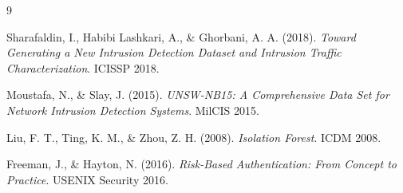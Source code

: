 \documentclass[11pt,a4paper]{article}
\begin{document}
\begin{thebibliography}{9}

Sharafaldin, I., Habibi Lashkari, A., \& Ghorbani, A. A. (2018).
\textit{Toward Generating a New Intrusion Detection Dataset and Intrusion Traffic Characterization}.
ICISSP 2018.

Moustafa, N., \& Slay, J. (2015).
\textit{UNSW-NB15: A Comprehensive Data Set for Network Intrusion Detection Systems}.
MilCIS 2015.

Liu, F. T., Ting, K. M., \& Zhou, Z. H. (2008).
\textit{Isolation Forest}.
ICDM 2008.

Freeman, J., \& Hayton, N. (2016).
\textit{Risk-Based Authentication: From Concept to Practice}.
USENIX Security 2016.

\end{thebibliography}
\end{document}
